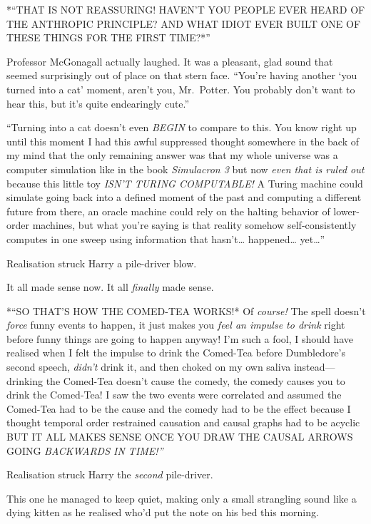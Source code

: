 *``THAT IS NOT REASSURING! HAVEN'T YOU PEOPLE EVER HEARD OF THE
ANTHROPIC PRINCIPLE? AND WHAT IDIOT EVER BUILT ONE OF THESE THINGS FOR
THE FIRST TIME?*''

Professor McGonagall actually laughed. It was a pleasant, glad sound
that seemed surprisingly out of place on that stern face. ``You're
having another `you turned into a cat' moment, aren't you, Mr.~Potter.
You probably don't want to hear this, but it's quite endearingly cute.''

``Turning into a cat doesn't even \emph{BEGIN} to compare to this. You
know right up until this moment I had this awful suppressed thought
somewhere in the back of my mind that the only remaining answer was that
my whole universe was a computer simulation like in the book
\emph{Simulacron 3} but now \emph{even that is ruled out} because this
little toy \emph{ISN'T TURING COMPUTABLE!} A Turing machine could
simulate going back into a defined moment of the past and computing a
different future from there, an oracle machine could rely on the halting
behavior of lower-order machines, but what you're saying is that reality
somehow self-consistently computes in one sweep using information that
hasn't\ldots{} happened\ldots{} yet\ldots{}''

Realisation struck Harry a pile-driver blow.

It all made sense now. It all \emph{finally} made sense.

*``SO THAT'S HOW THE COMED-TEA WORKS!* Of \emph{course!} The spell
doesn't \emph{force} funny events to happen, it just makes you
\emph{feel an impulse to drink} right before funny things are going to
happen anyway! I'm such a fool, I should have realised when I felt the
impulse to drink the Comed-Tea before Dumbledore's second speech,
\emph{didn't} drink it, and then choked on my own saliva
instead---drinking the Comed-Tea doesn't cause the comedy, the comedy
causes you to drink the Comed-Tea! I saw the two events were correlated
and assumed the Comed-Tea had to be the cause and the comedy had to be
the effect because I thought temporal order restrained causation and
causal graphs had to be acyclic BUT IT ALL MAKES SENSE ONCE YOU DRAW THE
CAUSAL ARROWS GOING \emph{BACKWARDS IN TIME!''}

Realisation struck Harry the \emph{second} pile-driver.

This one he managed to keep quiet, making only a small strangling sound
like a dying kitten as he realised who'd put the note on his bed this
morning.

